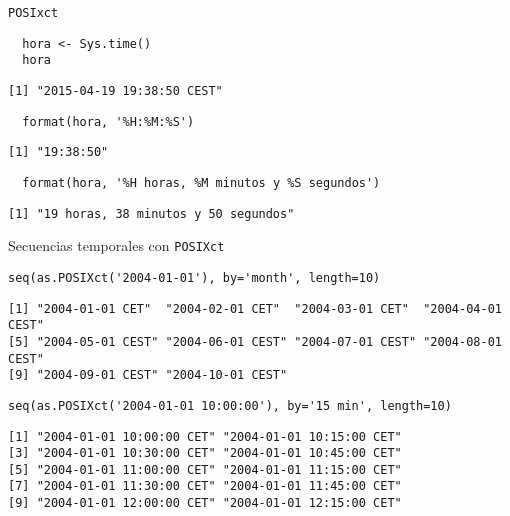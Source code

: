 \documentclass[xcolor={usenames,svgnames,dvipsnames}]{beamer}
\begin{document}
\begin{frame}[fragile,label=sec-2-4]{\texttt{POSIxct}}
 \lstset{language=R,label= ,caption= ,numbers=none}
\begin{lstlisting}
  hora <- Sys.time()
  hora
\end{lstlisting}

\begin{verbatim}
[1] "2015-04-19 19:38:50 CEST"
\end{verbatim}

\lstset{language=R,label= ,caption= ,numbers=none}
\begin{lstlisting}
  format(hora, '%H:%M:%S')
\end{lstlisting}

\begin{verbatim}
[1] "19:38:50"
\end{verbatim}

\lstset{language=R,label= ,caption= ,numbers=none}
\begin{lstlisting}
  format(hora, '%H horas, %M minutos y %S segundos')
\end{lstlisting}

\begin{verbatim}
[1] "19 horas, 38 minutos y 50 segundos"
\end{verbatim}
\end{frame}

\begin{frame}[fragile,label=sec-2-5]{Secuencias temporales con \texttt{POSIXct}}
 \lstset{language=R,label= ,caption= ,numbers=none}
\begin{lstlisting}
seq(as.POSIXct('2004-01-01'), by='month', length=10)
\end{lstlisting}

\begin{verbatim}
[1] "2004-01-01 CET"  "2004-02-01 CET"  "2004-03-01 CET"  "2004-04-01 CEST"
[5] "2004-05-01 CEST" "2004-06-01 CEST" "2004-07-01 CEST" "2004-08-01 CEST"
[9] "2004-09-01 CEST" "2004-10-01 CEST"
\end{verbatim}

\lstset{language=R,label= ,caption= ,numbers=none}
\begin{lstlisting}
seq(as.POSIXct('2004-01-01 10:00:00'), by='15 min', length=10)
\end{lstlisting}

\begin{verbatim}
[1] "2004-01-01 10:00:00 CET" "2004-01-01 10:15:00 CET"
[3] "2004-01-01 10:30:00 CET" "2004-01-01 10:45:00 CET"
[5] "2004-01-01 11:00:00 CET" "2004-01-01 11:15:00 CET"
[7] "2004-01-01 11:30:00 CET" "2004-01-01 11:45:00 CET"
[9] "2004-01-01 12:00:00 CET" "2004-01-01 12:15:00 CET"
\end{verbatim}
\end{frame}
\end{document}
